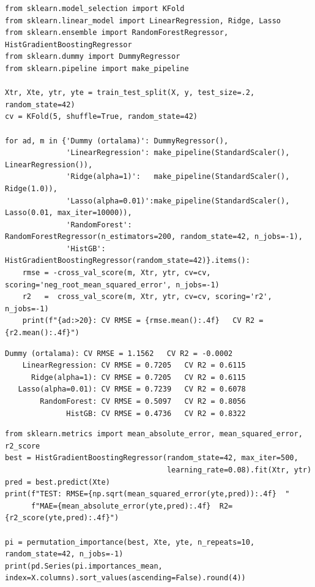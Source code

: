 \documentclass[11pt,a4paper]{article}
\begin{document}
\begin{lstlisting}
from sklearn.model_selection import KFold
from sklearn.linear_model import LinearRegression, Ridge, Lasso
from sklearn.ensemble import RandomForestRegressor, HistGradientBoostingRegressor
from sklearn.dummy import DummyRegressor
from sklearn.pipeline import make_pipeline

Xtr, Xte, ytr, yte = train_test_split(X, y, test_size=.2, random_state=42)
cv = KFold(5, shuffle=True, random_state=42)

for ad, m in {'Dummy (ortalama)': DummyRegressor(),
              'LinearRegression': make_pipeline(StandardScaler(), LinearRegression()),
              'Ridge(alpha=1)':   make_pipeline(StandardScaler(), Ridge(1.0)),
              'Lasso(alpha=0.01)':make_pipeline(StandardScaler(), Lasso(0.01, max_iter=10000)),
              'RandomForest':     RandomForestRegressor(n_estimators=200, random_state=42, n_jobs=-1),
              'HistGB':           HistGradientBoostingRegressor(random_state=42)}.items():
    rmse = -cross_val_score(m, Xtr, ytr, cv=cv, scoring='neg_root_mean_squared_error', n_jobs=-1)
    r2   =  cross_val_score(m, Xtr, ytr, cv=cv, scoring='r2', n_jobs=-1)
    print(f"{ad:>20}: CV RMSE = {rmse.mean():.4f}   CV R2 = {r2.mean():.4f}")
\end{lstlisting}

\begin{lstlisting}[style=outstyle]
    Dummy (ortalama): CV RMSE = 1.1562   CV R2 = -0.0002
    LinearRegression: CV RMSE = 0.7205   CV R2 = 0.6115
      Ridge(alpha=1): CV RMSE = 0.7205   CV R2 = 0.6115
   Lasso(alpha=0.01): CV RMSE = 0.7239   CV R2 = 0.6078
        RandomForest: CV RMSE = 0.5097   CV R2 = 0.8056
              HistGB: CV RMSE = 0.4736   CV R2 = 0.8322
\end{lstlisting}

\begin{lstlisting}
from sklearn.metrics import mean_absolute_error, mean_squared_error, r2_score
best = HistGradientBoostingRegressor(random_state=42, max_iter=500,
                                     learning_rate=0.08).fit(Xtr, ytr)
pred = best.predict(Xte)
print(f"TEST: RMSE={np.sqrt(mean_squared_error(yte,pred)):.4f}  "
      f"MAE={mean_absolute_error(yte,pred):.4f}  R2={r2_score(yte,pred):.4f}")

pi = permutation_importance(best, Xte, yte, n_repeats=10, random_state=42, n_jobs=-1)
print(pd.Series(pi.importances_mean, index=X.columns).sort_values(ascending=False).round(4))
\end{lstlisting}
\end{document}
